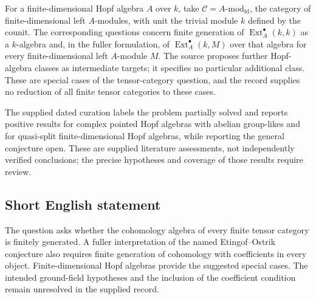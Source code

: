 \documentclass[11pt]{article}
\begin{document}
For a finite-dimensional Hopf algebra \(A\) over \(k\), take \(\mathcal C=A\text{-}\mathrm{mod}_{\mathrm{fd}}\), the category of finite-dimensional left \(A\)-modules, with unit the trivial module \(k\) defined by the counit. The corresponding questions concern finite generation of \(\operatorname{Ext}_{A}^{\bullet}(k,k)\) as a \(k\)-algebra and, in the fuller formulation, of \(\operatorname{Ext}_{A}^{\bullet}(k,M)\) over that algebra for every finite-dimensional left \(A\)-module \(M\). The source proposes further Hopf-algebra classes as intermediate targets; it specifies no particular additional class. These are special cases of the tensor-category question, and the record supplies no reduction of all finite tensor categories to these cases.

The supplied dated curation labels the problem partially solved and reports positive results for complex pointed Hopf algebras with abelian group-likes and for quasi-split finite-dimensional Hopf algebras, while reporting the general conjecture open. These are supplied literature assessments, not independently verified conclusions; the precise hypotheses and coverage of those results require review.
\subsection{Short English statement}
The question asks whether the cohomology algebra of every finite tensor category is finitely generated. A fuller interpretation of the named Etingof--Ostrik conjecture also requires finite generation of cohomology with coefficients in every object. Finite-dimensional Hopf algebras provide the suggested special cases. The intended ground-field hypotheses and the inclusion of the coefficient condition remain unresolved in the supplied record.
\end{document}
